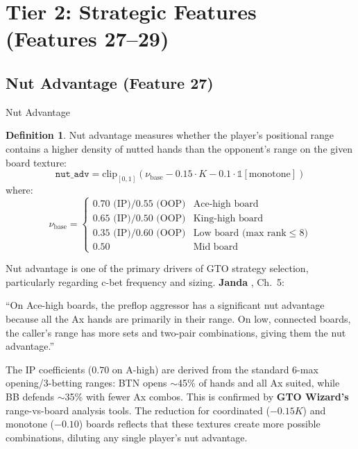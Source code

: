 \documentclass[11pt, a4paper]{article}
\theoremstyle{definition}
\newtheorem{definition}{Definition}[section]
\newcommand{\feature}[1]{\texttt{#1}}
\newcommand{\clip}[1]{\text{clip}_{[0,1]}\!\left(#1\right)}
\begin{document}
\section{Tier 2: Strategic Features (Features 27--29)}

\subsection{Nut Advantage (Feature 27)}

\begin{featurebox}{Nut Advantage}
\begin{definition}
Nut advantage measures whether the player's positional range contains a higher density of nutted hands than the opponent's range on the given board texture:
\begin{equation}
    \feature{nut\_adv} = \clip{\nu_{\text{base}} - 0.15 \cdot K - 0.1 \cdot \mathbb{1}[\text{monotone}]}
\end{equation}
where:
\begin{equation}
    \nu_{\text{base}} = \begin{cases}
        0.70 \text{ (IP)} / 0.55 \text{ (OOP)} & \text{Ace-high board} \\
        0.65 \text{ (IP)} / 0.50 \text{ (OOP)} & \text{King-high board} \\
        0.35 \text{ (IP)} / 0.60 \text{ (OOP)} & \text{Low board (max rank} \leq 8\text{)} \\
        0.50 & \text{Mid board}
    \end{cases}
\end{equation}
\end{definition}
\end{featurebox}

\begin{refbox}
Nut advantage is one of the primary drivers of GTO strategy selection, particularly regarding c-bet frequency and sizing. \textbf{Janda} \cite{janda2017}, Ch.~5:

``On Ace-high boards, the preflop aggressor has a significant nut advantage because all the Ax hands are primarily in their range. On low, connected boards, the caller's range has more sets and two-pair combinations, giving them the nut advantage.''

The IP coefficients ($0.70$ on A-high) are derived from the standard 6-max opening/3-betting ranges: BTN opens $\sim$45\% of hands and all Ax suited, while BB defends $\sim$35\% with fewer Ax combos. This is confirmed by \textbf{GTO Wizard's} range-vs-board analysis tools. The reduction for coordinated ($-0.15K$) and monotone ($-0.10$) boards reflects that these textures create more possible combinations, diluting any single player's nut advantage.
\end{refbox}
\end{document}
